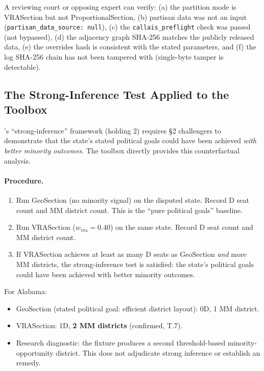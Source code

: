 A reviewing court or opposing expert can verify:
(a) the partition mode is VRASection but not ProportionalSection,
(b) partisan data was not an input (\texttt{partisan\_data\_source: null}),
(c) the \texttt{callais\_preflight} check was passed (not bypassed),
(d) the adjacency graph SHA-256 matches the publicly released data,
(e) the overrides hash is consistent with the stated parameters, and
(f) the log SHA-256 chain has not been tampered with (single-byte tamper
    is detectable).

\subsection{The Strong-Inference Test Applied to the Toolbox}

\callais{}'s ``strong-inference'' framework (holding 2) requires \S2 challengers
to demonstrate that the state's stated political goals could have been achieved
\emph{with better minority outcomes}.
The toolbox directly provides this counterfactual analysis.

\paragraph{Procedure.}
\begin{enumerate}
  \item Run GeoSection (no minority signal) on the disputed state.
    Record D seat count and MM district count. This is the ``pure political
    goals'' baseline.
  \item Run VRASection ($w_\text{vra} = 0.40$) on the same state.
    Record D seat count and MM district count.
  \item If VRASection achieves at least as many D seats as GeoSection \emph{and}
    more MM districts, the strong-inference test is satisfied: the state's
    political goals could have been achieved with better minority outcomes.
\end{enumerate}

For Alabama:
\begin{itemize}
  \item GeoSection (stated political goal: efficient district layout):
    0D, 1 MM district.
  \item VRASection: 1D, \textbf{2 MM districts} (confirmed, T.7).
  \item Research diagnostic: the fixture produces a second threshold-based
    minority-opportunity district. This does not adjudicate strong inference or
    establish an \allenmilligan{} remedy.
\end{itemize}

